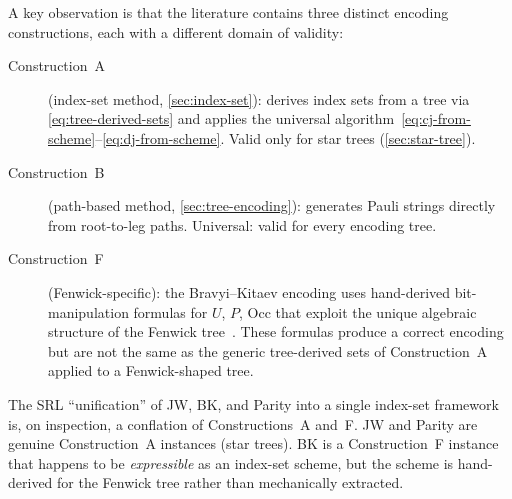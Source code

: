 A key observation is that the literature contains three distinct
encoding constructions, each with a different domain of validity:

\begin{description}
  \item[Construction~A] (index-set method,
    \cref{sec:index-set}): derives index sets from a tree via
    \eqref{eq:tree-derived-sets} and applies the universal
    algorithm~\eqref{eq:cj-from-scheme}--\eqref{eq:dj-from-scheme}.
    Valid only for star trees (\cref{sec:star-tree}).

  \item[Construction~B] (path-based method,
    \cref{sec:tree-encoding}): generates Pauli strings directly from
    root-to-leg paths.  Universal: valid for every encoding tree.

  \item[Construction~F] (Fenwick-specific): the Bravyi--Kitaev
    encoding uses hand-derived bit-manipulation formulas for $U$, $P$,
    $\mathrm{Occ}$ that exploit the unique algebraic structure of the
    Fenwick tree~\cite{fenwick1994}.  These formulas produce a correct
    encoding but are not the same as the generic tree-derived sets of
    Construction~A applied to a Fenwick-shaped tree.
\end{description}

The SRL ``unification'' of JW, BK, and Parity into a single index-set
framework is, on inspection, a conflation of Constructions~A and~F.
JW and Parity are genuine Construction~A instances (star trees).  BK
is a Construction~F instance that happens to be \emph{expressible} as
an index-set scheme, but the scheme is hand-derived for the Fenwick
tree rather than mechanically extracted.
